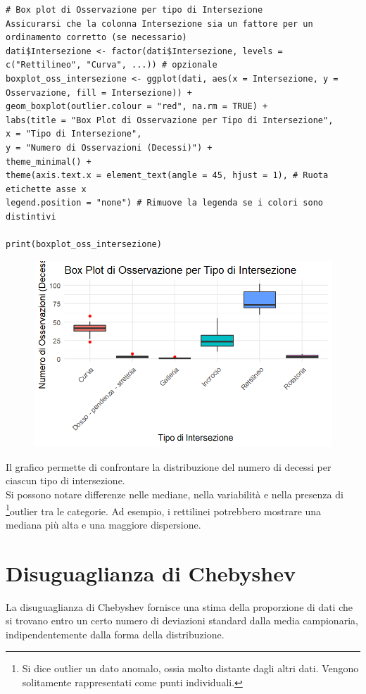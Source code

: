 \documentclass[14pt, openany, titlepage]{report} %
\begin{document}
\begin{center}
\begin{lstlisting}[breaklines=true]
# Box plot di Osservazione per tipo di Intersezione
Assicurarsi che la colonna Intersezione sia un fattore per un ordinamento corretto (se necessario)
dati$Intersezione <- factor(dati$Intersezione, levels = c("Rettilineo", "Curva", ...)) # opzionale
boxplot_oss_intersezione <- ggplot(dati, aes(x = Intersezione, y = Osservazione, fill = Intersezione)) +
geom_boxplot(outlier.colour = "red", na.rm = TRUE) +
labs(title = "Box Plot di Osservazione per Tipo di Intersezione",
x = "Tipo di Intersezione",
y = "Numero di Osservazioni (Decessi)") +
theme_minimal() +
theme(axis.text.x = element_text(angle = 45, hjust = 1), # Ruota etichette asse x
legend.position = "none") # Rimuove la legenda se i colori sono distintivi

print(boxplot_oss_intersezione)
\end{lstlisting}
\end{center}

\begin{figure}[H]
\centering
\includegraphics[width=12cm, height=7cm]{Rplot09.png}

\end{figure}
\noindent
Il grafico permette di confrontare la distribuzione  del numero di decessi per ciascun 
tipo di intersezione. \\ Si possono notare differenze nelle mediane, nella variabilità e 
 nella presenza di 
 \footnote{Si dice outlier un dato anomalo, ossia molto distante dagli altri dati. Vengono solitamente rappresentati come punti individuali.}outlier 
 tra le categorie. Ad esempio, i rettilinei potrebbero 
 mostrare una mediana più alta e una maggiore dispersione.

\section{Disuguaglianza di Chebyshev}
La disuguaglianza di Chebyshev fornisce una stima della proporzione di dati 
che si trovano entro un certo numero di deviazioni standard dalla media campionaria,
indipendentemente dalla forma della distribuzione.
\end{document}
